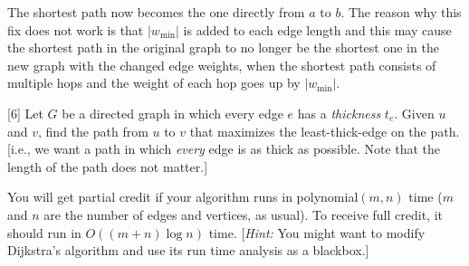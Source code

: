 \documentclass[addpoints]{exam}
\begin{document}
\begin{questions}
\begin{center}
\end{center}

The shortest path now becomes the one directly from $a$ to $b$. The reason why this fix does not work is that $|w_{\min}|$ is added to each edge length and this may cause the shortest path in the original graph to no longer be the shortest one in the new graph with the changed edge weights, when the shortest path consists of multiple hops and the weight of each hop goes up by $|w_{\min}|$.

[6]
Let $G$ be a directed graph in which every edge $e$ has a {\em thickness} $t_{e}$.  Given $u$ and $v$, find the path from $u$ to $v$ that maximizes the least-thick-edge on the path. [i.e., we want a path in which {\em every} edge is as thick as possible. Note that the length of the path does not matter.]

You will get partial credit if your algorithm runs in polynomial$(m, n)$ time ($m$ and $n$ are the number of edges and vertices, as usual). To receive full credit, it should run in $O((m+n)\log n)$ time. [{\em Hint: } You might want to modify Dijkstra's algorithm and use its run time analysis as a blackbox.]


\end{questions}
\end{document}
